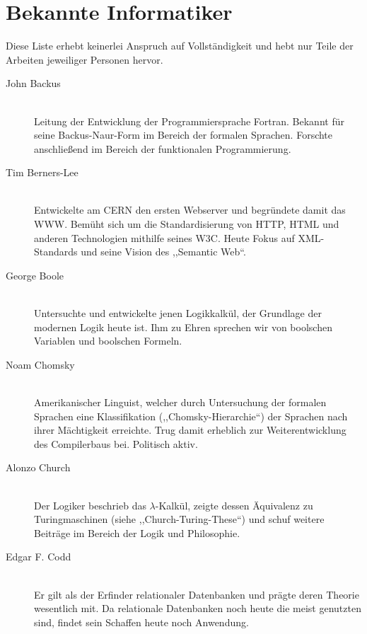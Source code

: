 \chapter{Bekannte Informatiker}
%
Diese Liste erhebt keinerlei Anspruch auf Vollständigkeit und hebt nur Teile der Arbeiten jeweiliger Personen hervor.
%
\begin{description}
  \item[John Backus ] \hfill{} \\
    Leitung der Entwicklung der Programmiersprache Fortran.
    Bekannt für seine Backus-Naur-Form im Bereich der formalen Sprachen.
    Forschte anschließend im Bereich der funktionalen Programmierung.

   \item[Tim Berners-Lee ] \hfill{} \\
    Entwickelte am CERN den ersten Webserver und begründete damit das WWW.
    Bemüht sich um die Standardisierung von HTTP, HTML und anderen Technologien mithilfe seines W3C.
    Heute Fokus auf XML-Standards und seine Vision des ,,Semantic Web``.

  \item[George Boole ] \hfill{} \\
    Untersuchte und entwickelte jenen Logikkalkül, der Grundlage der modernen Logik heute ist.
    Ihm zu Ehren sprechen wir von boolschen Variablen und boolschen Formeln.

  \item[Noam Chomsky ] \hfill{} \\
    Amerikanischer Linguist, welcher durch Untersuchung der formalen Sprachen eine Klassifikation (,,Chomsky-Hierarchie``) der Sprachen nach ihrer Mächtigkeit erreichte.
    Trug damit erheblich zur Weiterentwicklung des Compilerbaus bei.
    Politisch aktiv.

  \item[Alonzo Church ] \hfill{} \\
    Der Logiker beschrieb das $\lambda$-Kalkül, zeigte dessen Äquivalenz zu Turingmaschinen (siehe ,,Church-Turing-These``) und schuf weitere Beiträge im Bereich der Logik und Philosophie.

  \item[Edgar F. Codd ] \hfill{} \\
    Er gilt als der Erfinder relationaler Datenbanken und prägte deren Theorie wesentlich mit. Da relationale Datenbanken noch heute die meist genutzten sind, findet sein Schaffen heute noch Anwendung.


\end{description}
